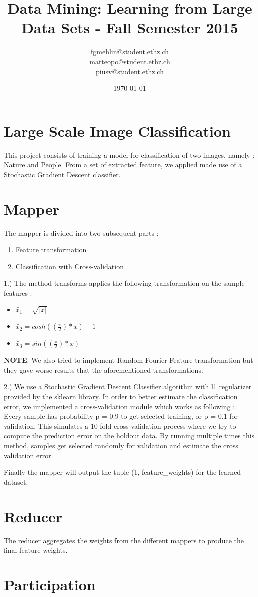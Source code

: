 \documentclass[a4paper, 11pt]{article}
\title{Data Mining: Learning from Large Data Sets - Fall Semester 2015}
\author{fgmehlin@student.ethz.ch\\ matteopo@student.ethz.ch\\ piusv@student.ethz.ch\\}
\date{\today}
\begin{document}
\maketitle

\section*{Large Scale Image Classification} 
This project consists of training a model for classification of two images, namely : Nature and People. From a set of extracted feature, we applied made use of a Stochastic Gradient Descent classifier.
\section{Mapper}

The mapper is divided into two subsequent parts :
\begin{enumerate}
\item Feature transformation
\item Classification with Cross-validation
\end{enumerate}

1.) The method transforms applies the following transformation on the sample features :
\begin{itemize}
\item $\widetilde{x_1} = \sqrt{|x|}$
\item $\widetilde{x_2} = cosh((\frac{\pi}{2})*x) - 1$
\item $\widetilde{x_3} = sin((\frac{\pi}{2})*x)$
\end{itemize}

\textbf{NOTE}: We also tried to implement Random Fourier Feature transformation but they gave worse results that the aforementioned transformations.

2.) We use a Stochastic Gradient Descent Classifier algorithm with l1 regularizer provided by the sklearn library. In order to better estimate the classification error, we implemented a cross-validation module which works as following : \\

Every sample has probability p = 0.9 to get selected training, or p = 0.1 for validation. This simulates a 10-fold cross validation process where we try to compute the prediction error on the holdout data. By running multiple times this method, samples get selected randomly for validation and estimate the cross validation error.

Finally the mapper will output the tuple (1, feature\_weights) for the learned dataset.

\section{Reducer}

The reducer aggregates the weights from the different mappers to produce the final feature weights.

\section{Participation}
\end{document}
